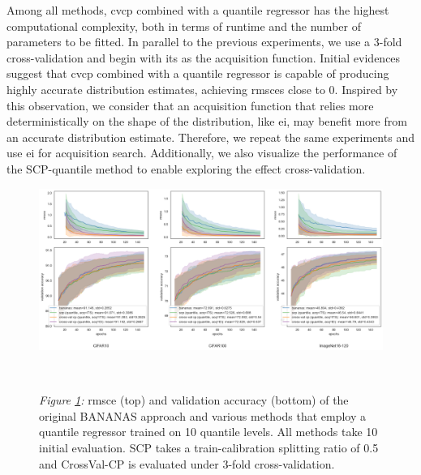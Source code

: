 \documentclass[a4paper,oneside,bibliography=totoc]{scrbook}
\begin{document}
\begin{description}[leftmargin=0cm, listparindent=\parindent]
 	\item[Performance for \gls{cvcp}:] Among all methods, \gls{cvcp} combined with a quantile regressor has the highest computational complexity, both in terms of runtime and the number of parameters to be fitted. In parallel to the previous experiments, we use a 3-fold cross-validation and begin with \gls{its} as the acquisition function. Initial evidences suggest that \gls{cvcp} combined with a quantile regressor is capable of producing highly accurate distribution estimates, achieving \gls{rmsce}s close to 0. Inspired by this observation, we consider that an acquisition function that relies more deterministically on the shape of the distribution, like \gls{ei}, may benefit more from an accurate distribution estimate. Therefore, we repeat the same experiments and use \gls{ei} for acquisition search. Additionally, we also visualize the performance of the SCP-quantile method to enable exploring the effect cross-validation.
 	
 	    \vspace{0.7em}
		\begin{figure}[H]
			\centering
			\includegraphics[scale=0.37 ]{figs/cvcp_quantile.png}
			\label{fig: cvcp_quantile}
			\\
 			\parbox{\linewidth}{
 			\vspace{0.5em}
  			{\small \textit{Figure \ref{fig: cvcp_quantile}:} \gls{rmsce} (top) and validation accuracy (bottom) of the original BANANAS approach and various methods that employ a quantile regressor trained on 10 quantile levels. All methods take 10 initial evaluation. SCP takes a train-calibration splitting ratio of 0.5 and CrossVal-CP is evaluated under 3-fold cross-validation.}
 	 	}	
		\end{figure}	
 	\vspace{0.2em}
 	

\end{description}
\end{document}
